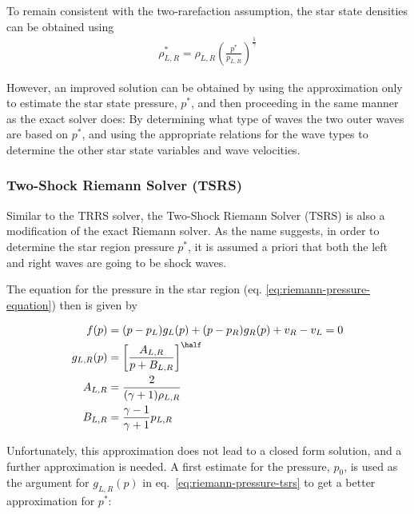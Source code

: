 To remain consistent with the two-rarefaction assumption, the star state densities can be obtained
using
\begin{align}
    \rho^*_{L,R} = \rho_{L,R} \left(\frac{p^*}{p_{L,R}} \right)^{\frac{1}{\gamma}}
\end{align}

However, an improved solution can be obtained by using the approximation only to estimate the star
state pressure, $p^*$, and then proceeding in the same manner as the exact solver does: By
determining what type of waves the two outer waves are based on $p^*$, and using the appropriate
relations for the wave types to determine the other star state variables and wave velocities.














\subsubsection{Two-Shock Riemann Solver (TSRS)}\label{chap:riemann-tsrs}


Similar to the TRRS solver, the Two-Shock Riemann Solver (TSRS) is also a modification of the exact
Riemann solver. As the name suggests, in order to determine the star region pressure $p^*$, it is
assumed a priori that both the left and right waves are going to be shock waves.


The equation for the pressure in the star region (eq. \ref{eq:riemann-pressure-equation}) then is given by

\begin{align}
	f(p) &= (p - p_L) g_L(p) + (p - p_R) g_R(p) + v_R - v_L = 0 \label{eq:riemann-pressure-tsrs} \\
	g_{L,R}(p) &= \left[ \frac{A_{L,R}}{p + B_{L,R}} \right] ^{\half} \\
	A_{L,R} &=
		\frac{2}{(\gamma + 1) \rho_{L,R}}\\
	B_{L,R} &=
		\frac{\gamma - 1}{\gamma + 1} p_{L,R}
\end{align}

Unfortunately, this approximation does not lead to a closed form solution, and a further
approximation is needed. A first estimate for the pressure, $p_0$, is used as the argument for
$g_{L,R}(p)$ in eq.~\ref{eq:riemann-pressure-tsrs} to get a better approximation for $p^*$:

